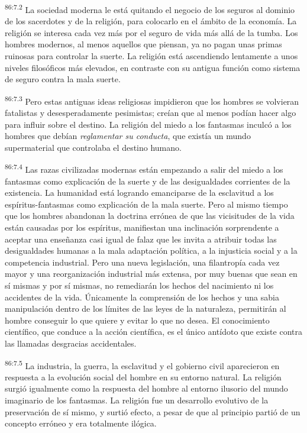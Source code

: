 \par
\textsuperscript{86:7.2} La sociedad moderna le está quitando el negocio de los seguros al dominio de los sacerdotes y de la religión, para colocarlo en el ámbito de la economía. La religión se interesa cada vez más por el seguro de vida más allá de la tumba. Los hombres modernos, al menos aquellos que piensan, ya no pagan unas primas ruinosas para controlar la suerte. La religión está ascendiendo lentamente a unos niveles filosóficos más elevados, en contraste con su antigua función como sistema de seguro contra la mala suerte.

\par
\textsuperscript{86:7.3} Pero estas antiguas ideas religiosas impidieron que los hombres se volvieran fatalistas y desesperadamente pesimistas; creían que al menos podían hacer algo para influir sobre el destino. La religión del miedo a los fantasmas inculcó a los hombres que debían \textit{reglamentar su conducta}, que existía un mundo supermaterial que controlaba el destino humano.

\par
\textsuperscript{86:7.4} Las razas civilizadas modernas están empezando a salir del miedo a los fantasmas como explicación de la suerte y de las desigualdades corrientes de la existencia. La humanidad está logrando emanciparse de la esclavitud a los espíritus-fantasmas como explicación de la mala suerte. Pero al mismo tiempo que los hombres abandonan la doctrina errónea de que las vicisitudes de la vida están causadas por los espíritus, manifiestan una inclinación sorprendente a aceptar una enseñanza casi igual de falaz que les invita a atribuir todas las desigualdades humanas a la mala adaptación política, a la injusticia social y a la competencia industrial. Pero una nueva legislación, una filantropía cada vez mayor y una reorganización industrial más extensa, por muy buenas que sean en sí mismas y por sí mismas, no remediarán los hechos del nacimiento ni los accidentes de la vida. Únicamente la comprensión de los hechos y una sabia manipulación dentro de los límites de las leyes de la naturaleza, permitirán al hombre conseguir lo que quiere y evitar lo que no desea. El conocimiento científico, que conduce a la acción científica, es el único antídoto que existe contra las llamadas desgracias accidentales.

\par
\textsuperscript{86:7.5} La industria, la guerra, la esclavitud y el gobierno civil aparecieron en respuesta a la evolución social del hombre en su entorno natural. La religión surgió igualmente como la respuesta del hombre al entorno ilusorio del mundo imaginario de los fantasmas. La religión fue un desarrollo evolutivo de la preservación de sí mismo, y surtió efecto, a pesar de que al principio partió de un concepto erróneo y era totalmente ilógica.

